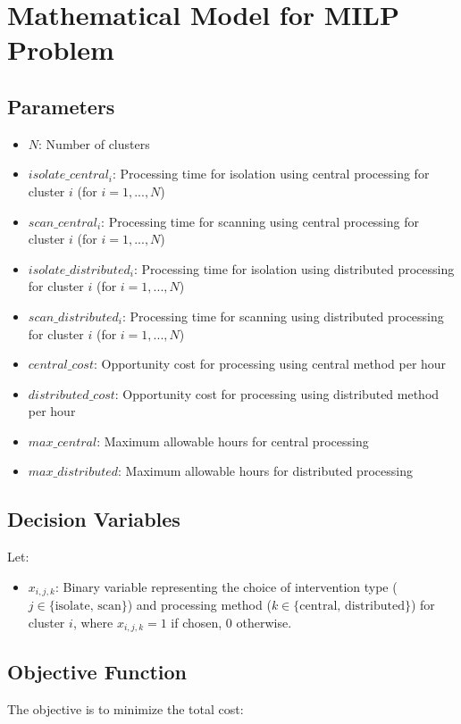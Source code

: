 \documentclass{article}
\begin{document}
\section*{Mathematical Model for MILP Problem}

\subsection*{Parameters}
\begin{itemize}
    \item $N$: Number of clusters
    \item $isolate\_central_i$: Processing time for isolation using central processing for cluster $i$ (for $i = 1, ..., N$)
    \item $scan\_central_i$: Processing time for scanning using central processing for cluster $i$ (for $i = 1, ..., N$)
    \item $isolate\_distributed_i$: Processing time for isolation using distributed processing for cluster $i$ (for $i = 1, ..., N$)
    \item $scan\_distributed_i$: Processing time for scanning using distributed processing for cluster $i$ (for $i = 1, ..., N$)
    \item $central\_cost$: Opportunity cost for processing using central method per hour
    \item $distributed\_cost$: Opportunity cost for processing using distributed method per hour
    \item $max\_central$: Maximum allowable hours for central processing
    \item $max\_distributed$: Maximum allowable hours for distributed processing
\end{itemize}

\subsection*{Decision Variables}
Let:
\begin{itemize}
    \item $x_{i,j,k}$: Binary variable representing the choice of intervention type ($j \in \{\text{isolate, scan}\}$) and processing method ($k \in \{\text{central, distributed}\}$) for cluster $i$, where $x_{i,j,k} = 1$ if chosen, 0 otherwise.
\end{itemize}

\subsection*{Objective Function}
The objective is to minimize the total cost:
\end{document}
